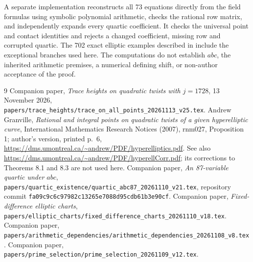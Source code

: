 \documentclass[11pt,a4paper]{article}
\begin{document}
A separate implementation reconstructs all 73 equations directly
from the field formulas using symbolic polynomial arithmetic, checks
the rational row matrix, and independently expands every quartic
coefficient. It checks the universal point and contact identities
and rejects a changed coefficient, missing row and corrupted quartic.
The 702 exact elliptic examples described in \cite{TraceAll} include
the exceptional branches used here. The computations do not establish
$abc$, the inherited arithmetic premises, a numerical defining shift,
or non-author acceptance of the proof.

\begin{thebibliography}{9}
 Companion paper, \emph{Trace heights on quadratic
twists with $j=1728$}, 13 November 2026,
\nolinkurl{papers/trace_heights/trace_on_all_points_20261113_v25.tex}.
 Andrew Granville, \emph{Rational and integral points
on quadratic twists of a given hyperelliptic curve}, International
Mathematics Research Notices (2007), rnm027, Proposition 1; author's
version, printed p.~6, \url{https://dms.umontreal.ca/~andrew/PDF/hyperelliptics.pdf}.
See also \url{https://dms.umontreal.ca/~andrew/PDF/hyperellCorr.pdf};
its corrections to Theorems 8.1 and 8.3 are not used here.
 Companion paper, \emph{An 87-variable quartic under
$abc$}, \nolinkurl{papers/quartic_existence/quartic_abc87_20261110_v21.tex},
repository commit \texttt{fa09c9c6c97982c13265e7088d95cdb61b3e90cf}.
 Companion paper, \emph{Fixed-difference elliptic
charts}, \nolinkurl{papers/elliptic_charts/fixed_difference_charts_20261110_v18.tex}.
 Companion paper,
\nolinkurl{papers/arithmetic_dependencies/arithmetic_dependencies_20261108_v8.tex}.
 Companion paper,
\nolinkurl{papers/prime_selection/prime_selection_20261109_v12.tex}.
\end{thebibliography}
\end{document}
